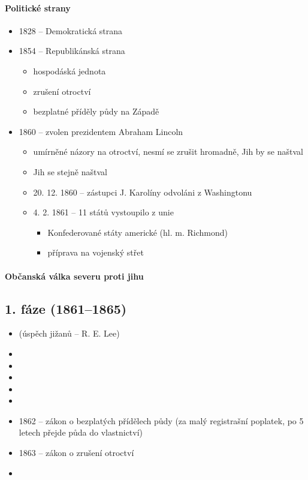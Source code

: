 \paragraph{Politické strany}
\begin{itemize}
\item 1828 -- Demokratická strana
\item 1854 -- Republikánská strana
	\begin{itemize}
	\item hospodáská jednota
	\item zrušení otroctví
	\item bezplatné příděly půdy na Západě
	\end{itemize}
\item 1860 -- zvolen prezidentem Abraham Lincoln
	\begin{itemize}
	\item umírněné názory na otroctví, nesmí se zrušit hromadně, Jih by se naštval
	\item Jih se stejně naštval 
	\item[\ra] 20. 12. 1860 -- zástupci J. Karolíny odvoláni z Washingtonu
	\item[\ra] 4. 2. 1861 -- 11 států vystoupilo z unie
		\begin{itemize}
		\item Konfederované státy americké (hl. m. Richmond)
		\item příprava na vojenský střet
		\end{itemize}
	\end{itemize}
\end{itemize}

\paragraph{Občanská válka severu proti jihu}
\subsection{1. fáze (1861--1865)}
\begin{itemize}
\item {} (úspěch jižanů -- R. E. Lee)
\item {}
\item
\item
\item
\item
\item 1862 -- zákon o bezplatých přídělech půdy (za malý registrašní poplatek, po 5 letech přejde půda do vlastnictví)
\item 1863 -- zákon o zrušení otroctví
\item 
\end{itemize}

